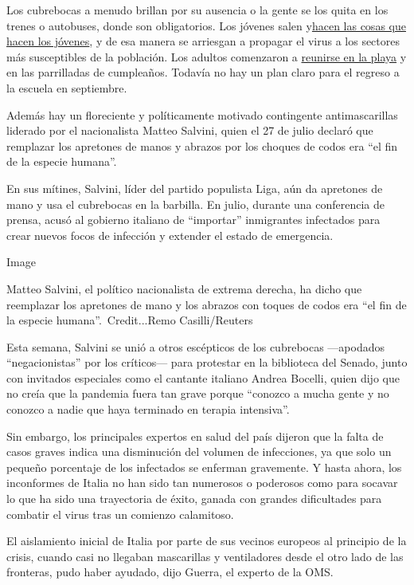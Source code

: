 Los cubrebocas a menudo brillan por su ausencia o la gente se los quita
en los trenes o autobuses, donde son obligatorios. Los jóvenes salen
y\href{https://www.nytimes3xbfgragh.onion/2020/05/29/world/europe/italy-young-people-coronavirus.html}{hacen
las cosas que hacen los jóvenes}, y de esa manera se arriesgan a
propagar el virus a los sectores más susceptibles de la población. Los
adultos comenzaron a
\href{https://www.nytimes3xbfgragh.onion/2020/05/27/world/europe/italy-beaches-coronavirus-reopening.html}{reunirse
en la playa} y en las parrilladas de cumpleaños. Todavía no hay un plan
claro para el regreso a la escuela en septiembre.

Además hay un floreciente y políticamente motivado contingente
antimascarillas liderado por el nacionalista Matteo Salvini, quien el 27
de julio declaró que remplazar los apretones de manos y abrazos por los
choques de codos era ``el fin de la especie humana''.

En sus mítines, Salvini, líder del partido populista Liga, aún da
apretones de mano y usa el cubrebocas en la barbilla. En julio, durante
una conferencia de prensa, acusó al gobierno italiano de ``importar''
inmigrantes infectados para crear nuevos focos de infección y extender
el estado de emergencia.

Image

Matteo Salvini, el político nacionalista de extrema derecha, ha dicho
que reemplazar los apretones de mano y los abrazos con toques de codos
era ``el fin de la especie humana''.~Credit...Remo Casilli/Reuters

Esta semana, Salvini se unió a otros escépticos de los cubrebocas
---apodados ``negacionistas'' por los críticos--- para protestar en la
biblioteca del Senado, junto con invitados especiales como el cantante
italiano Andrea Bocelli, quien dijo que no creía que la pandemia fuera
tan grave porque ``conozco a mucha gente y no conozco a nadie que haya
terminado en terapia intensiva''.

Sin embargo, los principales expertos en salud del país dijeron que la
falta de casos graves indica una disminución del volumen de infecciones,
ya que solo un pequeño porcentaje de los infectados se enferman
gravemente. Y hasta ahora, los inconformes de Italia no han sido tan
numerosos o poderosos como para socavar lo que ha sido una trayectoria
de éxito, ganada con grandes dificultades para combatir el virus tras un
comienzo calamitoso.

El aislamiento inicial de Italia por parte de sus vecinos europeos al
principio de la crisis, cuando casi no llegaban mascarillas y
ventiladores desde el otro lado de las fronteras, pudo haber ayudado,
dijo Guerra, el experto de la OMS.

